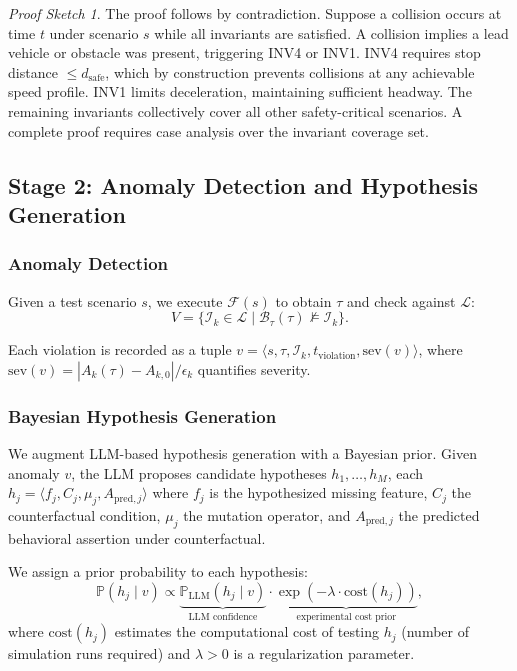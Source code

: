 \documentclass[journal]{IEEEtran}
\theoremstyle{plain}
\theoremstyle{definition}
\theoremstyle{remark}
\newtheorem*{proofsketch}{Proof Sketch}
\newcommand{\invlib}{\mathcal{L}}
\newcommand{\sys}{\mathcal{F}}
\newcommand{\beh}{\mathcal{B}}
\newcommand{\Prob}{\mathbb{P}}
\begin{document}
\begin{proofsketch}
The proof follows by contradiction. Suppose a collision occurs at time $t$ under scenario $s$ while all invariants are satisfied. A collision implies a lead vehicle or obstacle was present, triggering INV4 or INV1. INV4 requires stop distance $\leq d_{\text{safe}}$, which by construction prevents collisions at any achievable speed profile. INV1 limits deceleration, maintaining sufficient headway. The remaining invariants collectively cover all other safety-critical scenarios. A complete proof requires case analysis over the invariant coverage set.
\end{proofsketch}

\subsection{Stage 2: Anomaly Detection and Hypothesis Generation}

\subsubsection{Anomaly Detection}

Given a test scenario $s$, we execute $\sys(s)$ to obtain $\tau$ and check against $\invlib$:
\begin{equation}
V = \{\mathcal{I}_k \in \invlib \mid \beh_{\tau}(\tau) \not\models \mathcal{I}_k\}.
\label{eq:anomaly}
\end{equation}

Each violation is recorded as a tuple $v = \langle s, \tau, \mathcal{I}_k, t_{\text{violation}}, \text{sev}(v) \rangle$, where $\text{sev}(v) = |A_k(\tau) - A_{k,0}| / \epsilon_k$ quantifies severity.

\subsubsection{Bayesian Hypothesis Generation}

We augment LLM-based hypothesis generation with a Bayesian prior. Given anomaly $v$, the LLM proposes candidate hypotheses $h_1,\dots,h_M$, each $h_j = \langle f_j, C_j, \mu_j, A_{\text{pred},j} \rangle$ where $f_j$ is the hypothesized missing feature, $C_j$ the counterfactual condition, $\mu_j$ the mutation operator, and $A_{\text{pred},j}$ the predicted behavioral assertion under counterfactual.

We assign a prior probability to each hypothesis:
\begin{equation}
\Prob(h_j \mid v) \propto \underbrace{\Prob_{\text{LLM}}(h_j \mid v)}_{\text{LLM confidence}} \cdot \underbrace{\exp(-\lambda \cdot \text{cost}(h_j))}_{\text{experimental cost prior}},
\label{eq:hyp_prior}
\end{equation}
where $\text{cost}(h_j)$ estimates the computational cost of testing $h_j$ (number of simulation runs required) and $\lambda > 0$ is a regularization parameter.
\end{document}
